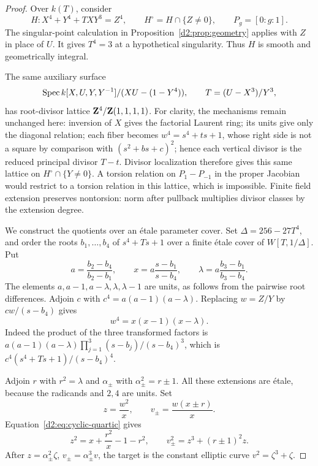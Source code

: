 \begin{proof}
Over \(k(T)\), consider
\[
 H\colon X^4+Y^4+TXY^3=Z^4,\qquad
 H^\circ=H\cap\{Z\ne0\},\qquad
 P_g=[0:g:1].
\]
The singular-point calculation in
Proposition~\ref{d2:prop:geometry} applies with \(Z\) in place of \(U\).
It gives \(T^4=3\) at a hypothetical singularity.
Thus \(H\) is smooth and geometrically integral.

The same auxiliary surface
\[
 \operatorname{Spec} k[X,U,Y,Y^{-1}]/(XU-(1-Y^4)),
 \qquad T=(U-X^3)/Y^3,
\]
has root-divisor lattice \(\mathbf{Z}^4/\mathbf{Z}(1,1,1,1)\).
For clarity, the mechanisms remain unchanged here: inversion of \(X\)
gives the factorial Laurent ring; its units give only the diagonal
relation; each fiber becomes
\(w^4=s^4+ts+1\), whose right side is not a square by comparison
with \((s^2+bs+c)^2\); hence each vertical divisor is the reduced
principal divisor \(T-t\).
Divisor localization therefore gives this same lattice on
\(H^\circ\cap\{Y\ne0\}\).
A torsion relation on \(P_1-P_{-1}\) in the proper Jacobian would
restrict to a torsion relation in this lattice, which is impossible.
Finite field extension preserves nontorsion: norm after pullback multiplies divisor classes by the extension degree.

We construct the quotients over an \'etale parameter cover.
Set \(\Delta=256-27T^4\), and order the roots
\(b_1,\ldots,b_4\) of \(s^4+Ts+1\) over a finite \'etale cover of
\(W[T,1/\Delta]\).
Put
\[
 a=\frac{b_2-b_4}{b_2-b_1},\qquad
 x=a\frac{s-b_1}{s-b_4},\qquad
 \lambda=a\frac{b_3-b_1}{b_3-b_4}.
\]
The elements \(a,a-1,a-\lambda,\lambda,\lambda-1\) are units,
as follows from the pairwise root differences.
Adjoin \(c\) with \(c^4=a(a-1)(a-\lambda)\).
Replacing \(w=Z/Y\) by \(cw/(s-b_4)\) gives
\begin{equation}\label{d2:eq:cyclic-quartic}
 w^4=x(x-1)(x-\lambda).
\end{equation}
Indeed the product of the three transformed factors is
\(a(a-1)(a-\lambda)\prod_{j=1}^3(s-b_j)/(s-b_4)^3\),
which is \(c^4(s^4+Ts+1)/(s-b_4)^4\).

Adjoin \(r\) with \(r^2=\lambda\) and
\(\alpha_\pm\) with \(\alpha_\pm^2=r\pm1\).
All these extensions are \'etale, because the radicands and \(2,4\)
are units.
Set
\[
 z=\frac{w^2}{x},\qquad v_\pm=\frac{w(x\pm r)}x.
\]
Equation~\eqref{d2:eq:cyclic-quartic} gives
\begin{equation}\label{d2:eq:elliptic-quotients}
 z^2=x+\frac{r^2}{x}-1-r^2,\qquad
 v_\pm^2=z^3+(r\pm1)^2z.
\end{equation}
After \(z=\alpha_\pm^2\zeta\), \(v_\pm=\alpha_\pm^3v\),
the target is the constant elliptic curve \(v^2=\zeta^3+\zeta\).


\end{proof}
